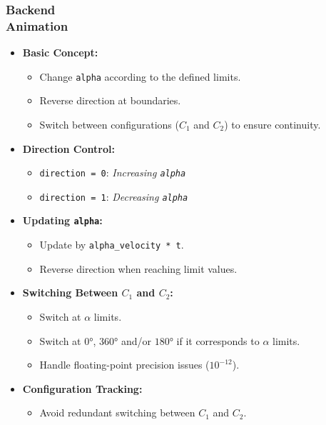 \documentclass[ucs,10pt]{beamer}
\begin{document}
\begin{frame}
\begin{minipage}{0.45\linewidth}
\begin{center}
        \end{center}
    \end{minipage}
\end{frame}

\begin{frame}
    \frametitle{Backend \\ \small \color{rwth-blue} Animation}
    \begin{itemize}
        \item \textbf{Basic Concept:}
        \begin{itemize}
            \item Change \texttt{alpha} according to the defined limits.
            \item Reverse direction at boundaries.
            \item Switch between configurations ($C_1$ and $C_2$) to ensure continuity.
        \end{itemize}

        \item \textbf{Direction Control:}
        \begin{itemize}
            \item \texttt{direction = 0}: \textit{Increasing \texttt{alpha}}
            \item \texttt{direction = 1}: \textit{Decreasing \texttt{alpha}}
        \end{itemize}

        \item \textbf{Updating \texttt{alpha}:}
        \begin{itemize}
            \item Update by \texttt{alpha\_velocity * t}.
            \item Reverse direction when reaching limit values.
        \end{itemize}

        \item \textbf{Switching Between $C_1$ and $C_2$:}
        \begin{itemize}
        	\item Switch at $\alpha$ limits.
            \item Switch at $0$°, $360$° and/or $180$° if it corresponds to $\alpha$ limits.
            \item Handle floating-point precision issues (\(10^{-12}\)).
        \end{itemize}

        \item \textbf{Configuration Tracking:}
        \begin{itemize}
            \item Avoid redundant switching between $C_1$ and $C_2$.
        \end{itemize}
    \end{itemize}
\end{frame}
\end{document}
